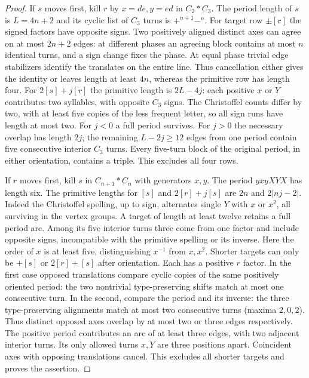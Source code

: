 \documentclass[11pt,letterpaper]{article}
\numberwithin{equation}{section}
\theoremstyle{remark}
\begin{document}
\begin{proof}
If \(s\) moves first, kill \(r\) by \(x=de,y=ed\) in \(C_2*C_3\). The period length of \(s\)
is \(L=4n+2\) and its cyclic list of \(C_3\) turns is \(+^{n+1}-^n\).
For target row \(\pm[r]\) the signed factors have opposite signs.
Two positively aligned distinct axes can agree on at most \(2n+2\)
edges: at different phases an agreeing block contains at most \(n\)
identical turns, and a sign change fixes the phase. At equal phase
trivial edge stabilizers identify the translates on the entire line.
Thus cancellation either gives the identity or leaves length at least
\(4n\), whereas the primitive row has length four.
For \(2[s]+j[r]\) the primitive length is \(2L-4j\): each positive
\(x\) or \(Y\) contributes two syllables, with opposite \(C_3\) signs.
The Christoffel counts differ by two, with at least five copies of
the less frequent letter, so all sign runs have length at most two.
For \(j<0\) a full period survives. For \(j>0\) the necessary overlap
has length \(2j\); the remaining \(L-2j\ge12\) edges from one period
contain five consecutive interior \(C_3\) turns. Every five-turn
block of the original period, in either orientation, contains a
triple. This excludes all four rows.

If \(r\) moves first, kill \(s\) in \(C_{n+1}*C_n\) with generators
\(x,y\). The period \(yxyXYX\) has length six. The primitive
lengths for \([s]\) and \(2[r]+j[s]\) are \(2n\) and \(2|nj-2|\).
Indeed the Christoffel spelling, up to sign, alternates single \(Y\)
with \(x\) or \(x^2\), all surviving in the vertex groups. A target
of length at least twelve retains a full period arc. Among its five
interior turns three come from one factor and include opposite signs,
incompatible with the primitive spelling or its inverse. Here the
order of \(x\) is at least five, distinguishing \(x^{-1}\) from
\(x,x^2\). Shorter targets can only be \(+[s]\) or \(2[r]+[s]\)
after orientation. Each has a positive \(r\) factor. In the first
case opposed translations compare cyclic copies of the same
positively oriented period: the two nontrivial type-preserving shifts
match at most one consecutive turn. In the second, compare the period
and its inverse: the three type-preserving alignments match at most
two consecutive turns (maxima \(2,0,2\)). Thus distinct opposed axes
overlap by at most two or three edges respectively. The positive
period contributes an arc of at least three edges, with two adjacent
interior turns. Its only allowed turns \(x,Y\) are three positions
apart. Coincident axes with opposing translations cancel. This
excludes all shorter targets and proves the assertion.
\end{proof}
\end{document}
